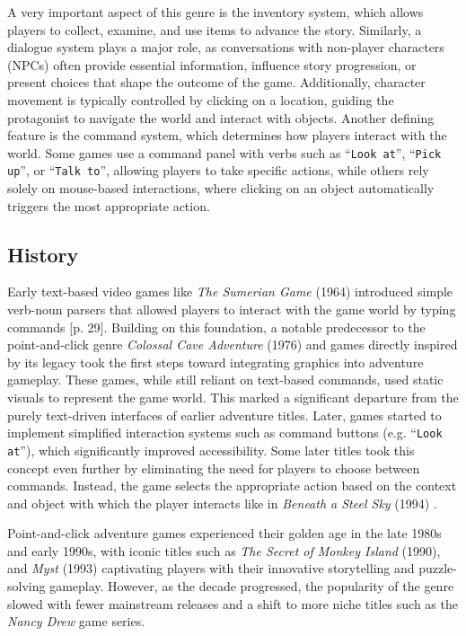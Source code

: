 A very important aspect of this genre is the inventory system, which allows players to collect, examine, and use items to advance the story. Similarly, a dialogue system plays a major role, as conversations with non-player characters (NPCs) often provide essential information, influence story progression, or present choices that shape the outcome of the game. Additionally, character movement is typically controlled by clicking on a location, guiding the protagonist to navigate the world and interact with objects. Another defining feature is the command system, which determines how players interact with the world. Some games use a command panel with verbs such as “\texttt{Look at}”, “\texttt{Pick up}”, or “\texttt{Talk to}”, allowing players to take specific actions, while others rely solely on mouse-based interactions, where clicking on an object automatically triggers the most appropriate action. 

\subsection{History}
Early text-based video games like \textit{The Sumerian Game} (1964) introduced simple verb-noun parsers that allowed players to interact with the game world by typing commands \cite{Salter2014}[p. 29]. Building on this foundation, a notable predecessor to the point-and-click genre \textit{Colossal Cave Adventure} (1976) and games directly inspired by its legacy took the first steps toward integrating graphics into adventure gameplay. These games, while still reliant on text-based commands, used static visuals to represent the game world. This marked a significant departure from the purely text-driven interfaces of earlier adventure titles. Later, games started to implement simplified interaction systems such as command buttons (e.g. “\texttt{Look at}”), which significantly improved accessibility. Some later titles took this concept even further by eliminating the need for players to choose between commands. Instead, the game selects the appropriate action based on the context and object with which the player interacts like in \textit{Beneath a Steel Sky} (1994) \cite{Carton2023history}.

Point-and-click adventure games experienced their golden age in the late 1980s and early 1990s, with iconic titles such as \textit{The Secret of Monkey Island} (1990), and \textit{Myst} (1993) captivating players with their innovative storytelling and puzzle-solving gameplay. However, as the decade progressed, the popularity of the genre slowed \cite{Qaffas202022} with fewer mainstream releases and a shift to more niche titles such as the \textit{Nancy Drew} game series.

